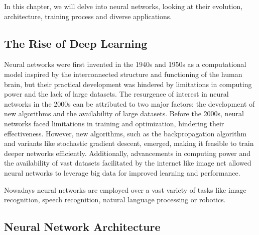 In this chapter, we will delve into neural networks, looking at their evolution, architecture, training process and diverse applications.
% 

\subsection{The Rise of Deep Learning}

Neural networks were first invented in the 1940s and 1950s as a computational model inspired by the interconnected structure and functioning of the human brain, but their practical development was hindered by limitations in computing power and the lack of large datasets. 
The resurgence of interest in neural networks in the 2000s can be attributed to two major factors: the development of new algorithms and the availability of large datasets. Before the 2000s, neural networks faced limitations in training and optimization, hindering their effectiveness. However, new algorithms, such as the backpropagation algorithm and variants like stochastic gradient descent, emerged, making it feasible to train deeper networks efficiently. Additionally, advancements in computing power and the availability of vast datasets facilitated by the internet like image net  allowed neural networks to leverage big data for improved learning and performance.

Nowadays neural networks are employed over a vast variety of tasks like image recognition, speech recognition, natural language processing or robotics. 

\subsection{Neural Network Architecture}

